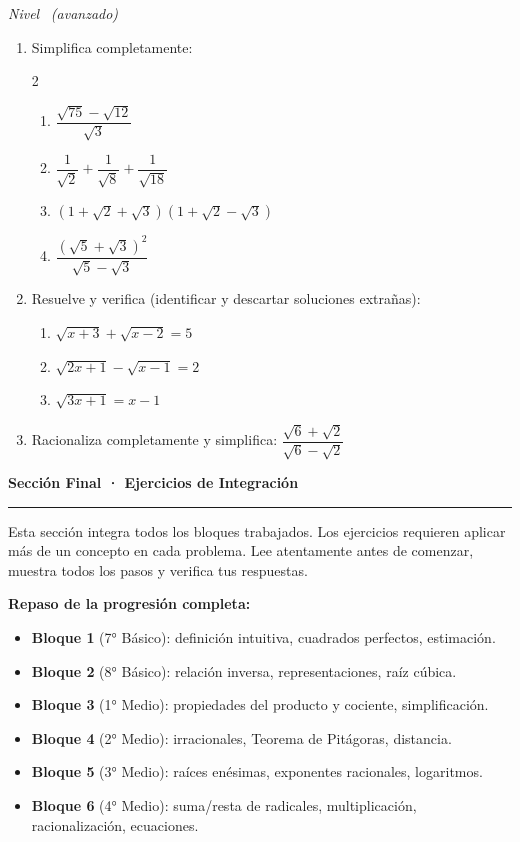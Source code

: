 \documentclass[11pt, letterpaper]{article}
\newcommand{\seccionheader}[2]{%
  \vspace{1.2em}
  \noindent
  {\Large\bfseries\color{#1} #2}\par
  \vspace{0.3em}
  {\noindent\color{#1}\rule{\linewidth}{0.8pt}}
  \vspace{0.8em}
}
\begin{document}
\textit{Nivel} \bigstar\bigstar\bigstar\ \textit{(avanzado)}

\begin{enumerate}[label=\textbf{\arabic*.}, leftmargin=*, resume]
  \item Simplifica completamente:
  \begin{multicols}{2}
  \begin{enumerate}[label=\alph*)]
    \item $\dfrac{\sqrt{75}-\sqrt{12}}{\sqrt{3}}$
    \item $\dfrac{1}{\sqrt{2}}+\dfrac{1}{\sqrt{8}}+\dfrac{1}{\sqrt{18}}$
    \item $(1+\sqrt{2}+\sqrt{3})(1+\sqrt{2}-\sqrt{3})$
    \item $\dfrac{(\sqrt{5}+\sqrt{3})^2}{\sqrt{5}-\sqrt{3}}$
  \end{enumerate}
  \end{multicols}

  \item Resuelve y verifica (identificar y descartar soluciones extrañas):
  \begin{enumerate}[label=\alph*)]
    \item $\sqrt{x+3}+\sqrt{x-2}=5$
    \item $\sqrt{2x+1}-\sqrt{x-1}=2$
    \item $\sqrt{3x+1}=x-1$
  \end{enumerate}

  \item Racionaliza completamente y simplifica: $\dfrac{\sqrt{6}+\sqrt{2}}{\sqrt{6}-\sqrt{2}}$
\end{enumerate}

\clearpage
\seccionheader{blockc}{Sección Final · Ejercicios de Integración}

\begin{tcolorbox}[importantbox, title={Indicaciones}]
Esta sección integra todos los bloques trabajados. Los ejercicios requieren aplicar más de un concepto en cada problema. Lee atentamente antes de comenzar, muestra todos los pasos y verifica tus respuestas.

\medskip
\textbf{Repaso de la progresión completa:}
\begin{itemize}
  \item \textbf{Bloque 1} (7° Básico): definición intuitiva, cuadrados perfectos, estimación.
  \item \textbf{Bloque 2} (8° Básico): relación inversa, representaciones, raíz cúbica.
  \item \textbf{Bloque 3} (1° Medio): propiedades del producto y cociente, simplificación.
  \item \textbf{Bloque 4} (2° Medio): irracionales, Teorema de Pitágoras, distancia.
  \item \textbf{Bloque 5} (3° Medio): raíces enésimas, exponentes racionales, logaritmos.
  \item \textbf{Bloque 6} (4° Medio): suma/resta de radicales, multiplicación, racionalización, ecuaciones.
\end{itemize}
\end{tcolorbox}
\end{document}
